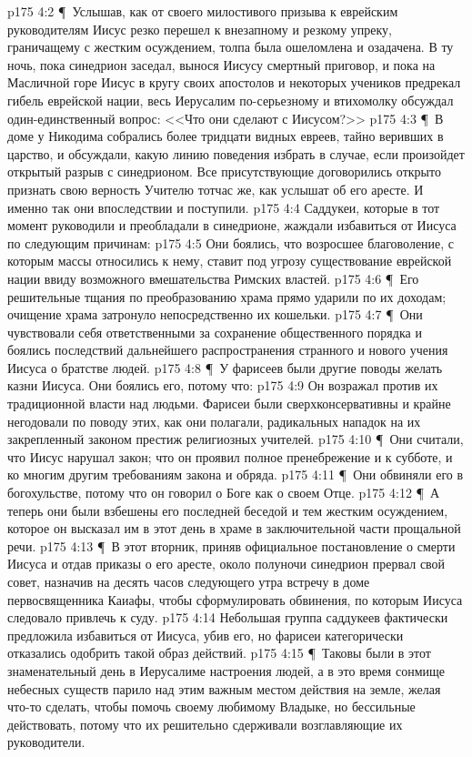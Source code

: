 \vs p175 4:2 \P\ Услышав, как от своего милостивого призыва к еврейским руководителям Иисус резко перешел к внезапному и резкому упреку, граничащему с жестким осуждением, толпа была ошеломлена и озадачена. В ту ночь, пока синедрион заседал, вынося Иисусу смертный приговор, и пока на Масличной горе Иисус в кругу своих апостолов и некоторых учеников предрекал гибель еврейской нации, весь Иерусалим по\hyp{}серьезному и втихомолку обсуждал один\hyp{}единственный вопрос: <<Что они сделают с Иисусом?>>
\vs p175 4:3 \P\ В доме у Никодима собрались более тридцати видных евреев, тайно веривших в царство, и обсуждали, какую линию поведения избрать в случае, если произойдет открытый разрыв с синедрионом. Все присутствующие договорились открыто признать свою верность Учителю тотчас же, как услышат об его аресте. И именно так они впоследствии и поступили.
\vs p175 4:4 Саддукеи, которые в тот момент руководили и преобладали в синедрионе, жаждали избавиться от Иисуса по следующим причинам:
\vs p175 4:5 \bibnobreakspace Они боялись, что возросшее благоволение, с которым массы относились к нему, ставит под угрозу существование еврейской нации ввиду возможного вмешательства Римских властей.
\vs p175 4:6 \P\ \bibnobreakspace Его решительные тщания по преобразованию храма прямо ударили по их доходам; очищение храма затронуло непосредственно их кошельки.
\vs p175 4:7 \P\ \bibnobreakspace Они чувствовали себя ответственными за сохранение общественного порядка и боялись последствий дальнейшего распространения странного и нового учения Иисуса о братстве людей.
\vs p175 4:8 \P\ У фарисеев были другие поводы желать казни Иисуса. Они боялись его, потому что:
\vs p175 4:9 \bibnobreakspace Он возражал против их традиционной власти над людьми. Фарисеи были сверхконсервативны и крайне негодовали по поводу этих, как они полагали, радикальных нападок на их закрепленный законом престиж религиозных учителей.
\vs p175 4:10 \P\ \bibnobreakspace Они считали, что Иисус нарушал закон; что он проявил полное пренебрежение и к субботе, и ко многим другим требованиям закона и обряда.
\vs p175 4:11 \P\ \bibnobreakspace Они обвиняли его в богохульстве, потому что он говорил о Боге как о своем Отце.
\vs p175 4:12 \P\ \bibnobreakspace А теперь они были взбешены его последней беседой и тем жестким осуждением, которое он высказал им в этот день в храме в заключительной части прощальной речи.
\vs p175 4:13 \P\ В этот вторник, приняв официальное постановление о смерти Иисуса и отдав приказы о его аресте, около полуночи синедрион прервал свой совет, назначив на десять часов следующего утра встречу в доме первосвященника Каиафы, чтобы сформулировать обвинения, по которым Иисуса следовало привлечь к суду.
\vs p175 4:14 Небольшая группа саддукеев фактически предложила избавиться от Иисуса, убив его, но фарисеи категорически отказались одобрить такой образ действий.
\vs p175 4:15 \P\ Таковы были в этот знаменательный день в Иерусалиме настроения людей, а в это время сонмище небесных существ парило над этим важным местом действия на земле, желая что\hyp{}то сделать, чтобы помочь своему любимому Владыке, но бессильные действовать, потому что их решительно сдерживали возглавляющие их руководители.
